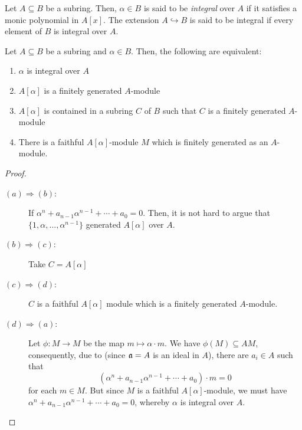 \begin{definition}
    Let $A\subseteq B$ be a subring. Then, $\alpha\in B$ is said to be \textit{integral} over $A$ if it satisfies a monic polynomial in $A[x]$. The extension $A\hookrightarrow B$ is said to be integral if every element of $B$ is integral over $A$.
\end{definition}

\begin{theorem}
    Let $A\subseteq B$ be a subring and $\alpha\in B$. Then, the following are equivalent: 
    \begin{enumerate}[label=(\alph*)]
        \item $\alpha$ is integral over $A$
        \item $A[\alpha]$ is a finitely generated $A$-module 
        \item $A[\alpha]$ is contained in a subring $C$ of $B$ such that $C$ is a finitely generated $A$-module 
        \item There is a faithful $A[\alpha]$-module $M$ which is finitely generated as an $A$-module.
    \end{enumerate}
\end{theorem}
\begin{proof}
\begin{description}
    \item[$(a)\Longrightarrow(b)$:] If $\alpha^n + a_{n - 1}\alpha^{n - 1} + \cdots + a_0 = 0$. Then, it is not hard to argue that $\{1,\alpha,\ldots,\alpha^{n - 1}\}$ generated $A[\alpha]$ over $A$.
    \item[$(b)\Longrightarrow(c)$:] Take $C = A[\alpha]$ 
    \item[$(c)\Longrightarrow(d)$:] $C$ is a faithful $A[\alpha]$ module which is a finitely generated $A$-module.
    \item[$(d)\Longrightarrow(a)$:] Let $\phi: M\to M$ be the map $m\mapsto\alpha\cdot m$. We have $\phi(M)\subseteq AM$, consequently, due to  (since $\mathfrak a = A$ is an ideal in $A$), there are $a_i\in A$ such that 
    \begin{equation*}
        (\alpha^n + a_{n - 1}\alpha^{n - 1} + \cdots + a_0)\cdot m = 0
    \end{equation*}
    for each $m\in M$. But since $M$ is a faithful $A[\alpha]$-module, we must have $\alpha^{n} + a_{n - 1}\alpha^{n - 1} + \cdots + a_0 = 0$, whereby $\alpha$ is integral over $A$.
\end{description}
\end{proof}

